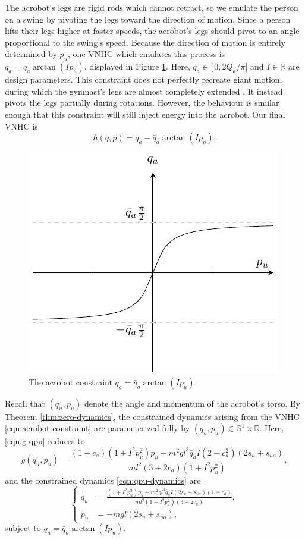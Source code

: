 \documentclass[journal,twoside,onecolumn,draftclsnofoot,web]{ieeecolor}
\newcommand*{\R}{\mathbb{R}}
\newcommand*{\Sone}{\mathbb{S}^1}
\newcommand*{\SxR}{\Sone \times \R}
\begin{document}
{The acrobot's legs are rigid rods which cannot retract, so we emulate the person
on a swing by pivoting the legs toward the direction of motion. 
Since a person lifts their legs higher at faster speeds, the acrobot's legs should
pivot to an angle proportional to the swing's speed.
Because the direction of motion is entirely determined by \(p_u\), 
one VNHC which emulates this process is \(q_a = \bar{q}_a\arctan( I p_u)\),
displayed in Figure \ref{fig:qa-arctan}.
Here, \(\bar{q}_a \in \, ]0,2 Q_a/\pi]\) and \(I \in \R\) are 
design parameters.
This constraint does not perfectly recreate giant motion, during which
the gymnast's legs are almost completely extended \cite{usagym_giant}.
It instead pivots the legs partially during rotations.
However, the behaviour is similar enough that this constraint will
still inject energy into the acrobot.
Our final VNHC is
\begin{equation}\label{eqn:acrobot-constraint}
    h(q,p) = q_a - \bar{q}_a \arctan(I p_u)
    .
\end{equation}

\begin{figure}
    \centering
    \includegraphics[width=0.7\linewidth]{qa_arctan.pdf}
    \caption{The acrobot constraint \(q_a = \bar{q}_a \arctan(I p_u)\).}
    \label{fig:qa-arctan}
\end{figure}

Recall that \((q_u, p_u)\) denote the angle and momentum of the acrobot's torso.
By Theorem \ref{thm:zero-dynamics}, the constrained dynamics arising from the
VNHC \eqref{eqn:acrobot-constraint} are parameterized fully by 
\((q_u,p_u) \in \SxR\).
Here, \eqref{eqn:g-qpu} reduces to
\begin{equation*}
    g(q_u,p_u) = \frac{
        (1+c_a)(1+I^2 p_u^2)p_u - m^2gl^3\bar{q}_a I (2-c_a^2)(2s_u + s_{ua})
    }{ml^2(3+2c_a)(1+I^2 p_u^2)}
    ,
\end{equation*}
and the constrained dynamics \eqref{eqn:qpu-dynamics} are
\begin{equation}\label{eqn:acrobot-constrained-dynamics}
    \begin{cases}
    \dot{q}_u &= \frac{(1+I^2 p_u^2)p_u + m^2gl^3\bar{q}_a I(2s_u + s_{ua})(1+c_a) }
            {ml^2(1+I^2 p_u^2)(3+2c_a)}
    ,    \\
    \dot{p}_u &= - m g l (2s_u + s_{ua})
    ,
    \end{cases}
\end{equation}
subject to \(q_a = \bar{q}_a \arctan(I p_u)\).

}
\end{document}
